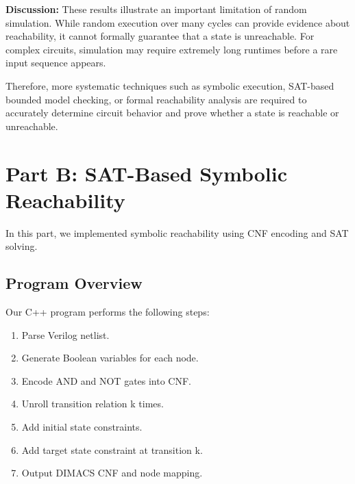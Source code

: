 \documentclass[10pt]{article}
\begin{document}




\vspace{0.3cm}
\noindent
\textbf{Discussion:}
\noindent
These results illustrate an important limitation of random simulation. While random execution over many cycles can provide evidence about reachability, it cannot formally guarantee that a state is unreachable. For complex circuits, simulation may require extremely long runtimes before a rare input sequence appears.

Therefore, more systematic techniques such as symbolic execution, SAT-based bounded model checking, or formal reachability analysis are required to accurately determine circuit behavior and prove whether a state is reachable or unreachable.


\section{Part B: SAT-Based Symbolic Reachability}

In this part, we implemented symbolic reachability using CNF encoding and SAT solving.

\subsection*{Program Overview}

Our C++ program performs the following steps:

\begin{enumerate}
\item Parse Verilog netlist.
\item Generate Boolean variables for each node.
\item Encode AND and NOT gates into CNF.
\item Unroll transition relation k times.
\item Add initial state constraints.
\item Add target state constraint at transition k.
\item Output DIMACS CNF and node mapping.
\end{enumerate}
\end{document}
